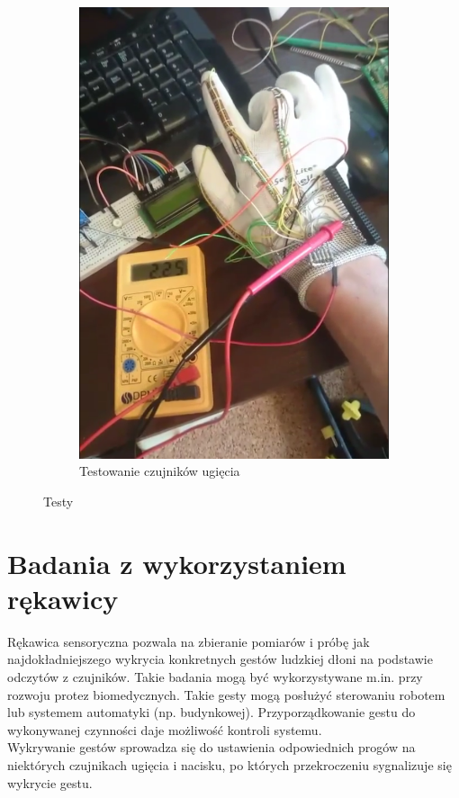 \documentclass[12pt,a4paper]{article}
\begin{document}
\begin{figure}[htb!]
\begin{subfigure}{.5\textwidth}
	\includegraphics[width=.9\textwidth]{images/ugiecie.png}
	\caption{Testowanie czujników ugięcia}
	\label{fig:ugiecie}
\end{subfigure}
\caption{Testy}
\label{fig:testy}
\end{figure}



\newpage
\section{Badania z wykorzystaniem rękawicy}
Rękawica sensoryczna pozwala na zbieranie pomiarów i próbę jak najdokładniejszego wykrycia konkretnych gestów ludzkiej dłoni na podstawie odczytów z czujników. Takie badania mogą być wykorzystywane m.in. przy rozwoju protez biomedycznych. Takie gesty mogą posłużyć sterowaniu robotem lub systemem automatyki (np. budynkowej). Przyporządkowanie gestu do wykonywanej czynności daje możliwość kontroli systemu.\\
Wykrywanie gestów sprowadza się do ustawienia odpowiednich progów na niektórych czujnikach ugięcia i nacisku, po których przekroczeniu sygnalizuje się wykrycie gestu.\\
\end{document}
